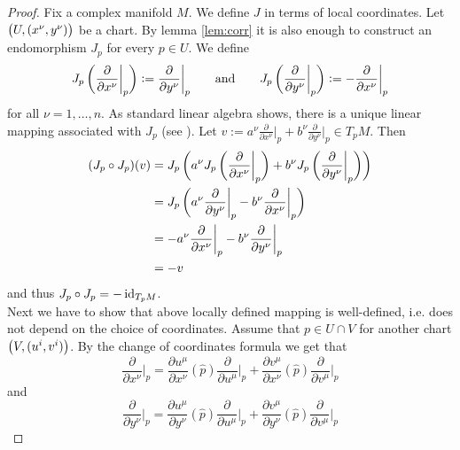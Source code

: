 \begin{proof}
Fix a complex manifold $M$. We define $J$ in terms of local coordinates. Let $\del[1]{U,(x^\nu,y^\nu)}$ be a chart. By lemma \ref{lem:corr} it is also enough to construct an endomorphism $J_p$ for every $p \in U$. We define
\begin{equation*}
J_p\del[3]{\frac{\partial}{\partial x^\nu}\bigg\vert_p} := \frac{\partial}{\partial y^\nu}\bigg\vert_p \qquad \text{and} \qquad J_p\del[3]{\frac{\partial}{\partial y^\nu}\bigg\vert_p} := -\frac{\partial}{\partial x^\nu}\bigg\vert_p
\end{equation*}
\noindent for all $\nu = 1,\dots,n$. As standard linear algebra shows, there is a unique linear mapping associated with $J_p$ (see \cite[69]{hoffman:linear_algebra:1971}). Let $v := a^\nu\frac{\partial}{\partial x^\nu}\big\vert_p + b^\nu\frac{\partial}{\partial y^\nu}\big\vert_p \in T_p M$. Then
\begin{align*}
(J_p \circ J_p)(v) &=J_p\del[3]{a^\nu J_p\del[3]{\frac{\partial}{\partial x^\nu}\bigg\vert_p} + b^\nu J_p\del[3]{\frac{\partial}{\partial y^\nu}\bigg\vert_p}}\\
&= J_p\del[3]{a^\nu \frac{\partial}{\partial y^\nu}\bigg\vert_p - b^\nu \frac{\partial}{\partial x^\nu}\bigg\vert_p}\\
&= -a^\nu \frac{\partial}{\partial x^\nu}\bigg\vert_p - b^\nu \frac{\partial}{\partial y^\nu}\bigg\vert_p\\
&= -v
\end{align*}
\noindent and thus $J_p \circ J_p = -\operatorname{id}_{T_pM}$.\\
Next we have to show that above locally defined mapping is well-defined, i.e. does not depend on the choice of coordinates. Assume that $p \in U \cap V$ for another chart $\del[1]{V,(u^i,v^i)}$. By the change of coordinates formula \cite[64]{lee:smooth_manifolds:2013} we get that
\begin{equation*}
\frac{\partial}{\partial x^\nu}\bigg\vert_p = \frac{\partial u^\mu}{\partial x^\nu}(\widehat{p})\frac{\partial}{\partial u^\mu}\bigg\vert_p + \frac{\partial v^\mu}{\partial x^\nu}(\widehat{p})\frac{\partial}{\partial v^\mu}\bigg\vert_p
\end{equation*}
\noindent and
\begin{equation*}
\frac{\partial}{\partial y^\nu}\bigg\vert_p = \frac{\partial u^\mu}{\partial y^\nu}(\widehat{p})\frac{\partial}{\partial u^\mu}\bigg\vert_p + \frac{\partial v^\mu}{\partial y^\nu}(\widehat{p})\frac{\partial}{\partial v^\mu}\bigg\vert_p 
\end{equation*}

\end{proof}
